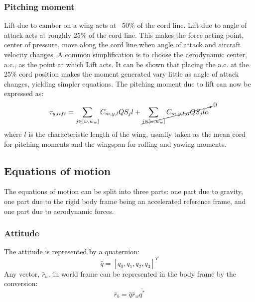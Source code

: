 \subsubsection{Pitching moment}
Lift due to camber on a wing acts at ~50\% of the cord line.
Lift due to angle of attack acts at roughly 25\% of the cord line.
This makes the force acting point, center of pressure, move along the cord line when angle of attack and aircraft velocity changes.
A common simplification is to choose the aerodynamic center, a.c., as the point at which Lift acts.
It can be shown that placing the a.c. at the 25\% cord position 
makes the moment generated vary little as angle of attack changes, yielding simpler equations.
The pitching moment due to lift can now be expressed as:
\begin{equation}
    \tau_{y,lift} = \sum_{j \in [w, w_w]}
    C_{m,y,l} Q S_j l +  \cancelto{0}{\sum_{j \in [w, w_w]}
    C_{m,y,l,\alpha} Q S_j l \alpha}
\end{equation}
where $l$ is the characteristic length of the wing, usually taken as the mean cord for pitching moments and the wingspan for rolling and yawing moments.

\subsection{Equations of motion}

The equations of motion can be split into three parts: one part due to gravity, one part due to the rigid body frame being an accelerated reference frame, and one part due to aerodynamic forces.

\subsubsection{Attitude}
The attitude is represented by a quaternion:
\begin{equation}
\bar{q} = [q_0, q_1, q_2, q_3]^T
\end{equation}
Any vector, $\bar{r}_w$, in world frame can be represented in the body frame by the conversion:
\begin{equation}
    \bar{r}_b = \bar{q} \bar{r}_w \bar{q^*}
\end{equation}
